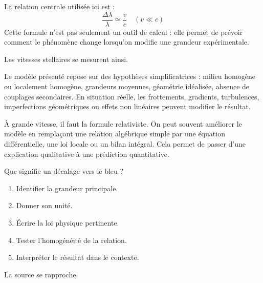 \documentclass[11pt,a4paper]{article}
\begin{document}
\begin{theorembox}
La relation centrale utilisée ici est :
\[
\frac{\Delta\lambda}{\lambda}\simeq\frac{v}{c}\quad(v\ll c)
\]
Cette formule n'est pas seulement un outil de calcul : elle permet de prévoir comment le phénomène change lorsqu'on modifie une grandeur expérimentale.
\end{theorembox}

\begin{odgbox}
Les vitesses stellaires se mesurent ainsi.
\end{odgbox}

\begin{attentionbox}
Le modèle présenté repose sur des hypothèses simplificatrices : milieu homogène ou localement homogène, grandeurs moyennes, géométrie idéalisée, absence de couplages secondaires. En situation réelle, les frottements, gradients, turbulences, imperfections géométriques ou effets non linéaires peuvent modifier le résultat.
\end{attentionbox}

\begin{approfondissementbox}
À grande vitesse, il faut la formule relativiste.
On peut souvent améliorer le modèle en remplaçant une relation algébrique simple par une équation différentielle, une loi locale ou un bilan intégral. Cela permet de passer d'une explication qualitative à une prédiction quantitative.
\end{approfondissementbox}

\begin{exercicebox}
Que signifie un décalage vers le bleu ?
\begin{enumerate}
  \item Identifier la grandeur principale.
  \item Donner son unité.
  \item Écrire la loi physique pertinente.
  \item Tester l'homogénéité de la relation.
  \item Interpréter le résultat dans le contexte.
\end{enumerate}
\end{exercicebox}

\begin{corrigebox}[Indication]
La source se rapproche.
\end{corrigebox}


\end{document}
